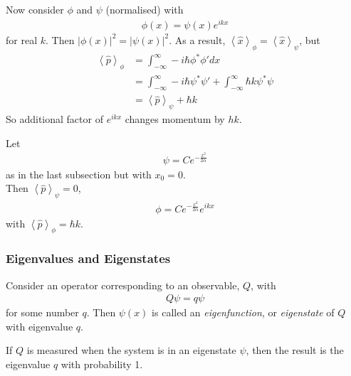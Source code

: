 \documentclass[a4paper]{article}
\begin{document}
Now consider $\phi$ and $\psi$ (normalised) with
\begin{equation*}
\begin{aligned}
\phi\left(x\right) = \psi\left(x\right) e^{ikx}
\end{aligned}
\end{equation*}
for real $k$. Then $|\phi\left(x\right)|^2 = |\psi\left(x\right)|^2$. As a result, $\left<\hat{x}\right>_\phi = \left<\hat{x}\right>_\psi$, but
\begin{equation*}
\begin{aligned}
\left<\hat{p}\right>_\phi &= \int_{-\infty}^\infty -i\hbar \phi^*\phi' dx\\
&= \int_{-\infty}^\infty -i\hbar \psi^* \psi' + \int_{-\infty}^\infty \hbar
k \psi^* \psi\\
&= \left<\hat{p}\right>_\psi + \hbar k
\end{aligned}
\end{equation*}
So additional factor of $e^{ikx}$ changes momentum by $hk$.

\begin{eg}
Let
\begin{equation*}
\begin{aligned}
\psi = C e^{-\frac{x^2}{2\alpha}}
\end{aligned}
\end{equation*}
as in the last subsection but with $x_0=0$.\\
Then $\left<\hat{p}\right>_\psi = 0$,
\begin{equation*}
\begin{aligned}
\phi = C e^{-\frac{x^2}{2\alpha}} e^{ikx}
\end{aligned}
\end{equation*}
with $\left<\hat{p}\right>_\phi = \hbar k$.
\end{eg}

\subsubsection{Eigenvalues and Eigenstates}
Consider an operator corresponding to an observable, $Q$, with
\begin{equation*}
\begin{aligned}
Q \psi = q\psi
\end{aligned}
\end{equation*}
for some number $q$. Then $\psi\left(x\right)$ is called an \emph{eigenfunction}, or \emph{eigenstate} of $Q$ with eigenvalue $q$.

\begin{post}
If $Q$ is measured when the system is in an eigenstate $\psi$, then the result is the eigenvalue $q$ with probability 1.
\end{post}
\end{document}
